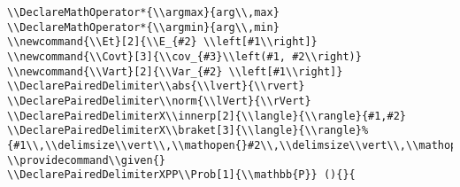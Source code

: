 \documentclass[c]{article}
\DeclareMathOperator{\Var}{Var}
\DeclareMathOperator{\cov}{Cov}
\DeclareMathOperator{\E}{\mathbb{E}}
\DeclareMathOperator*{\argmax}{arg\,max}
\DeclareMathOperator*{\argmin}{arg\,min}
\newcommand{\Et}[2]{\E_{#2} \left[#1\right]}
\newcommand{\Covt}[3]{\cov_{#3}\left(#1, #2\right)}
\newcommand{\Vart}[2]{\Var_{#2} \left[#1\right]}
\DeclarePairedDelimiter\abs{\lvert}{\rvert}
\DeclarePairedDelimiter\norm{\lVert}{\rVert}
\providecommand\given{}
\renewcommand\given{\nonscript\:\delimsize\vert\nonscript\:\mathopen{}}
\renewcommand\given{\nonscript\:\delimsize\vert\nonscript\:\mathopen{}}
\renewcommand\given{\nonscript\:\delimsize\vert\nonscript\:\mathopen{}}
\renewcommand\given{\nonscript\:\delimsize\vert\nonscript\:\mathopen{}}
\theoremstyle{plain}%
\theoremstyle{definition}
\theoremstyle{remark}
\begin{document}
\begin{verbatim}
\\DeclareMathOperator*{\\argmax}{arg\\,max}
\\DeclareMathOperator*{\\argmin}{arg\\,min}
\\newcommand{\\Et}[2]{\\E_{#2} \\left[#1\\right]}
\\newcommand{\\Covt}[3]{\\cov_{#3}\\left(#1, #2\\right)}
\\newcommand{\\Vart}[2]{\\Var_{#2} \\left[#1\\right]}
\\DeclarePairedDelimiter\\abs{\\lvert}{\\rvert}
\\DeclarePairedDelimiter\\norm{\\lVert}{\\rVert}
\\DeclarePairedDelimiterX\\innerp[2]{\\langle}{\\rangle}{#1,#2}
\\DeclarePairedDelimiterX\\braket[3]{\\langle}{\\rangle}%
{#1\\,\\delimsize\\vert\\,\\mathopen{}#2\\,\\delimsize\\vert\\,\\mathopen{}#3}
\\providecommand\\given{}
\\DeclarePairedDelimiterXPP\\Prob[1]{\\mathbb{P}} (){}{

\end{verbatim}
\end{document}
